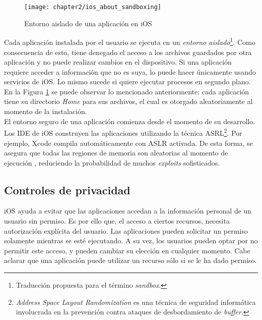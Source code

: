 \begin{figure}[hbtp]
	\centering
	\texttt{[image: chapter2/ios\_about\_sandboxing]}
    \caption{Entorno aislado de una aplicación en iOS \cite{iosdl}} 
    \label{fig:ch02:sandboxing}
\end{figure}
Cada aplicación instalada por el usuario se ejecuta en un \emph{entorno aislado}\footnote{Traducción propuesta para el término \textit{sandbox}.}. Como consecuencia de esto, tiene denegado el acceso a los archivos guardados por otra aplicación y no puede realizar cambios en el dispositivo. Si una aplicación requiere acceder a información que no es suya, lo puede hacer únicamente usando servicios de iOS. Lo mismo sucede si quiere ejecutar procesos en segundo plano. En la Figura \ref{fig:ch02:sandboxing} se puede observar lo mencionado anteriormente: cada aplicación tiene su directorio \textit{Home} para sus archivos, el cual es otorgado aleatoriamente al momento de la instalación.\\

El entorno seguro de una aplicación comienza desde el momento de su desarrollo. Los IDE de iOS construyen las aplicaciones utilizando la técnica ASRL\footnote{\textit{Address Space Layout Randomization} es una técnica de seguridad informática involucrada en la prevención contra ataques de desbordamiento de \textit{buffer}.}. Por ejemplo, Xcode compila automáticamente con ASLR activada. De esta forma, se asegura que todas las regiones de memoria son aleatorias al momento de ejecución \cite{asg}, reduciendo la probabilidad de muchos \textit{exploits} sofisticados.
\subsection{Controles de privacidad}
iOS ayuda a evitar que las aplicaciones accedan a la información personal de un usuario sin permiso. Es por ello que, el acceso a ciertos recursos, necesita autorización explícita del usuario. Las aplicaciones pueden solicitar un permiso solamente mientras se esté ejecutando. A su vez, los usuarios pueden optar por no permitir este acceso, y pueden cambiar su elección en cualquier momento. Cabe aclarar que una aplicación puede utilizar un recurso sólo si se le ha dado permiso.\\

